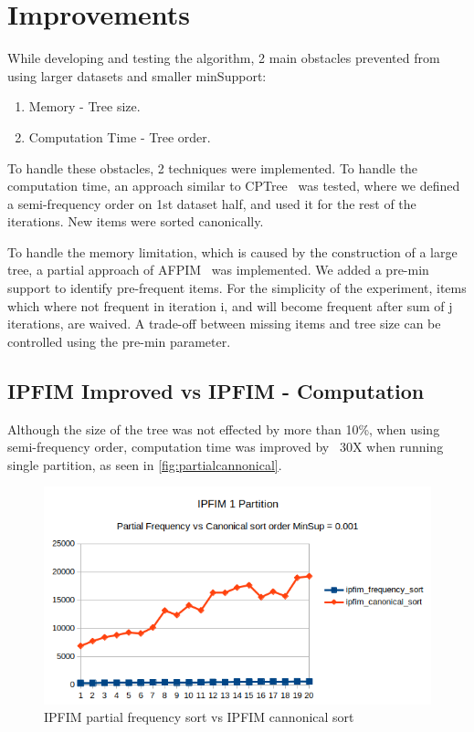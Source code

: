 
\section{Improvements}
\label{sec:improvements}

While developing and testing the algorithm, 2 main obstacles prevented from using larger datasets and smaller minSupport:
\begin{enumerate}
	\item Memory - Tree size.
	\item Computation Time - Tree order.
\end{enumerate}

To handle these obstacles, 2 techniques were implemented.
To handle the computation time, an approach similar to CPTree~\cite{tanbeer2009efficient} was tested, where we defined a semi-frequency order on 1st dataset half, and used it for the rest of the iterations. New items were sorted canonically.

To handle the memory limitation, which is caused by the construction of a large tree, a partial approach of AFPIM~\cite{koh2004efficient} was implemented. We added a pre-min support to identify pre-frequent items. For the simplicity of the experiment, items which where not frequent in iteration i, and will become frequent after sum of j iterations, are waived. A trade-off between missing items and tree size can be controlled using the pre-min parameter. 

\subsection{IPFIM Improved vs IPFIM - Computation}
Although the size of the tree was not effected by more than 10\%, when using semi-frequency order, computation time was improved by ~30X when running single partition, as seen in \autoref{fig:partialcannonical}.
\begin{figure}
  \centering
  \includegraphics[width=\linewidth]{figures/ipfim_freq_vs_can_sort}
  \caption{IPFIM partial frequency sort vs IPFIM cannonical sort}
  \label{fig:partialcannonical}
\end{figure}

